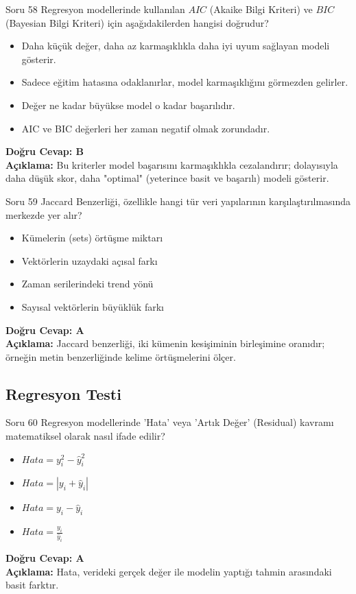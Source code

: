 \documentclass[12pt,a4paper]{article}
\begin{document}
\begin{testcard}{Soru 58}
    Regresyon modellerinde kullanılan $AIC$ (Akaike Bilgi Kriteri) ve $BIC$ (Bayesian Bilgi Kriteri) için aşağıdakilerden hangisi doğrudur?
    \begin{itemize}
        \item[A)] Daha küçük değer, daha az karmaşıklıkla daha iyi uyum sağlayan modeli gösterir.
        \item[B)] Sadece eğitim hatasına odaklanırlar, model karmaşıklığını görmezden gelirler.
        \item[C)] Değer ne kadar büyükse model o kadar başarılıdır.
        \item[D)] AIC ve BIC değerleri her zaman negatif olmak zorundadır.
    \end{itemize}
    \tcblower
    \textbf{Doğru Cevap: B} \\
    \textbf{Açıklama:} Bu kriterler model başarısını karmaşıklıkla cezalandırır; dolayısıyla daha düşük skor, daha "optimal" (yeterince basit ve başarılı) modeli gösterir.
\end{testcard}

\begin{testcard}{Soru 59}
    Jaccard Benzerliği, özellikle hangi tür veri yapılarının karşılaştırılmasında merkezde yer alır?
    \begin{itemize}
        \item[A)] Kümelerin (sets) örtüşme miktarı
        \item[B)] Vektörlerin uzaydaki açısal farkı
        \item[C)] Zaman serilerindeki trend yönü
        \item[D)] Sayısal vektörlerin büyüklük farkı
    \end{itemize}
    \tcblower
    \textbf{Doğru Cevap: A} \\
    \textbf{Açıklama:} Jaccard benzerliği, iki kümenin kesişiminin birleşimine oranıdır; örneğin metin benzerliğinde kelime örtüşmelerini ölçer.
\end{testcard}

\newpage
\subsection{Regresyon Testi}

\begin{testcard}{Soru 60}
    Regresyon modellerinde 'Hata' veya 'Artık Değer' (Residual) kavramı matematiksel olarak nasıl ifade edilir?
    \begin{itemize}
        \item[A)] $Hata = y_i^2 - \hat{y}_i^2$
        \item[B)] $Hata = |y_i + \hat{y}_i|$
        \item[C)] $Hata = y_i - \hat{y}_i$
        \item[D)] $Hata = \frac{y_i}{\hat{y}_i}$
    \end{itemize}
    \tcblower
    \textbf{Doğru Cevap: A} \\
    \textbf{Açıklama:} Hata, verideki gerçek değer ile modelin yaptığı tahmin arasındaki basit farktır.
\end{testcard}
\end{document}
